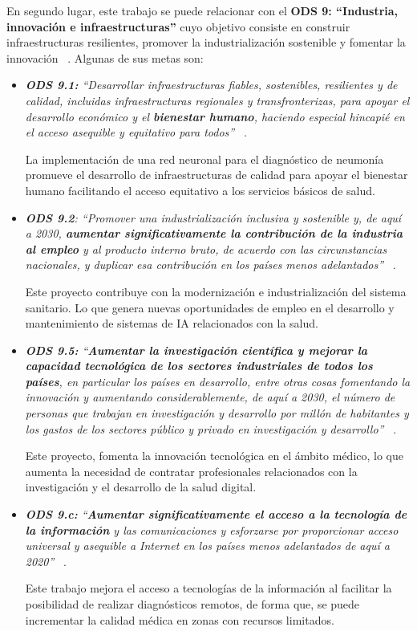 En segundo lugar, este trabajo se puede relacionar con el \textbf{ODS 9: ``Industria, innovación e infraestructuras''} cuyo objetivo consiste en construir infraestructuras resilientes, promover la industrialización sostenible y fomentar la innovación ~\cite{ObDeSoInfraestructura24}. Algunas de sus metas son:
\begin{itemize}
    \item \textit{\textbf{ODS 9.1:} ``Desarrollar infraestructuras fiables, sostenibles, resilientes y de calidad, incluidas infraestructuras regionales y transfronterizas, para apoyar el desarrollo económico y el \textbf{bienestar humano}, haciendo especial hincapié en el acceso asequible y equitativo para todos''} ~\cite{ObDeSoInfraestructura24}.

    La implementación de una red neuronal para el diagnóstico de neumonía promueve el desarrollo de infraestructuras de calidad para apoyar el bienestar humano facilitando el acceso equitativo a los servicios básicos de salud.

    \item \textit{\textbf{ODS 9.2}: ``Promover una industrialización inclusiva y sostenible y, de aquí a 2030, \textbf{aumentar significativamente la contribución de la industria al empleo} y al producto interno bruto, de acuerdo con las circunstancias nacionales, y duplicar esa contribución en los países menos adelantados''} ~\cite{ObDeSoInfraestructura24}.

    Este proyecto contribuye con la modernización e industrialización del sistema sanitario. Lo que genera nuevas oportunidades de empleo en el desarrollo y mantenimiento de sistemas de IA relacionados con la salud.

    \item \textit{\textbf{ODS 9.5:} ``\textbf{Aumentar la investigación científica y mejorar la capacidad tecnológica de los sectores industriales de todos los países}, en particular los países en desarrollo, entre otras cosas fomentando la innovación y aumentando considerablemente, de aquí a 2030, el número de personas que trabajan en investigación y desarrollo por millón de habitantes y los gastos de los sectores público y privado en investigación y desarrollo''} ~\cite{ObDeSoInfraestructura24}.

    Este proyecto, fomenta la innovación tecnológica en el ámbito médico, lo que aumenta la necesidad de contratar profesionales relacionados con la investigación y el desarrollo de la salud digital.

    \item \textit{\textbf{ODS 9.c:} ``\textbf{Aumentar significativamente el acceso a la tecnología de la información} y las comunicaciones y esforzarse por proporcionar acceso universal y asequible a Internet en los países menos adelantados de aquí a 2020''} ~\cite{ObDeSoInfraestructura24}.

    Este trabajo mejora el acceso a tecnologías de la información al facilitar la posibilidad de realizar diagnósticos remotos, de forma que, se puede incrementar la calidad médica en zonas con recursos limitados.
\end{itemize}
